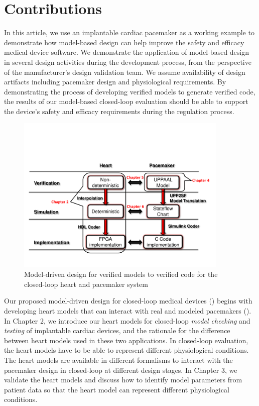 \section{Contributions}
In this article, we use an implantable cardiac pacemaker as a working example to demonstrate how model-based design can help improve the safety and efficacy medical device software. We demonstrate the application of model-based design in several design activities during the development process, from the perspective of the manufacturer's design validation team. We assume availability of design artifacts including pacemaker design and physiological requirements. By demonstrating the process of developing verified models to generate verified code, the results of our model-based closed-loop evaluation should be able to support the device's safety and efficacy requirements during the regulation process.
\begin{figure}[t]
		\centering
		\includegraphics[width=0.9\textwidth]{figs/model_based_b.pdf}
		\caption{\small Model-driven design for verified models to verified code for the closed-loop heart and pacemaker system}
		\label{fig:modeling_overview}
\end{figure}

Our proposed model-driven design for closed-loop medical devices () begins with developing heart models that can interact with real and modeled pacemakers (\cite{VHM_proc}). In Chapter 2, we introduce our heart models for closed-loop  \emph{model checking} and  \emph{testing} of implantable cardiac devices, and the rationale for the difference between heart models used in these two applications. In closed-loop evaluation, the heart models have to be able to represent different physiological conditions. The heart models are available in different formalisms to interact with the pacemaker design in closed-loop at different design stages. In Chapter 3, we validate the heart models and discuss how to identify model parameters from patient data so that the heart model can represent different physiological conditions. 

